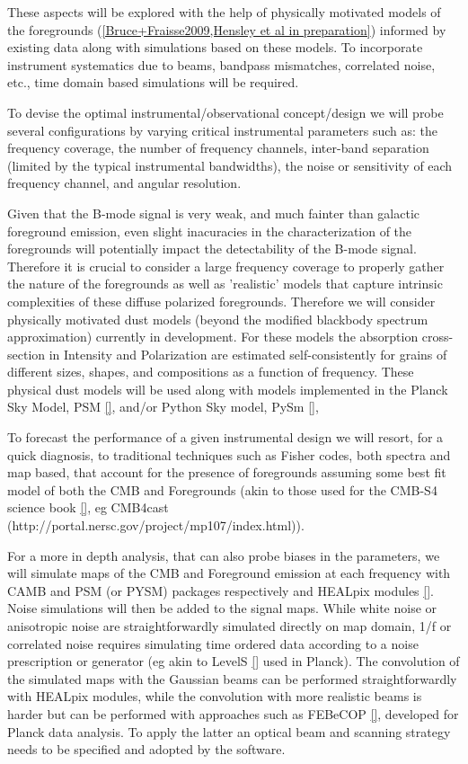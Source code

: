 These aspects will be explored with the help of physically motivated models of the foregrounds (\ref{Bruce+Fraisse2009,Hensley et al in preparation}) informed by existing data along with simulations based on these models. To incorporate instrument systematics due to beams, bandpass mismatches, correlated noise, etc., time domain based simulations will be required.

To devise the optimal instrumental/observational concept/design we will probe several configurations by varying critical instrumental parameters such as: the frequency coverage, the number of frequency channels, inter-band separation (limited by the typical instrumental bandwidths), the noise or sensitivity of each frequency channel, and angular resolution. 

Given that the B-mode signal is very weak, and much fainter than galactic foreground emission, even slight inacuracies in the characterization of the foregrounds will potentially impact the detectability of the B-mode signal. Therefore it is crucial to consider a large frequency coverage to properly gather the nature of the foregrounds as well as 'realistic' models that capture intrinsic complexities of these diffuse polarized foregrounds.
Therefore we will consider physically motivated dust models (beyond the modified blackbody spectrum approximation) currently in development. 
For these models the absorption cross-section in Intensity and Polarization are estimated self-consistently for grains of different sizes, shapes, and compositions as a function of frequency. These physical dust models will be used along with models implemented in the Planck Sky Model, PSM \ref{}, and/or  Python Sky model, PySm \ref{}, 


To forecast the performance of a given instrumental design we will resort, for a quick diagnosis, to traditional techniques such as Fisher codes, both spectra and map based, that account for the presence of foregrounds assuming some best fit model of both the CMB and Foregrounds (akin to those used for the CMB-S4 science book \ref{}, eg CMB4cast (http://portal.nersc.gov/project/mp107/index.html)). 

For a more in depth analysis, that can also probe biases in the parameters, we will simulate maps of the CMB and Foreground emission at each frequency with CAMB and PSM (or PYSM) packages respectively and HEALpix modules \ref{}. Noise simulations will then be added to the signal maps.
While white noise or anisotropic noise are straightforwardly simulated directly on map domain, 1/f or correlated noise requires simulating time ordered data according to a noise prescription or generator (eg akin to LevelS \ref{} used in Planck). The convolution of the simulated maps with the Gaussian beams can be performed straightforwardly with HEALpix modules, while the convolution with more realistic beams is harder but can be performed with approaches such as FEBeCOP \ref{}, developed for Planck data analysis. To apply the latter an optical beam and scanning strategy needs to be specified and adopted by the software.


